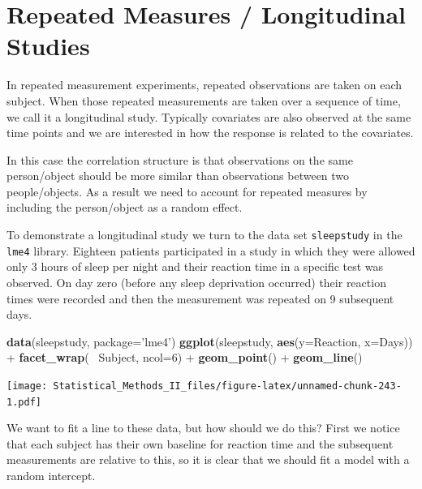 \documentclass[]{book}
\newenvironment{Shaded}{\begin{snugshade}}{\end{snugshade}}
\newcommand{\KeywordTok}[1]{\textcolor[rgb]{0.13,0.29,0.53}{\textbf{{#1}}}}
\newcommand{\DataTypeTok}[1]{\textcolor[rgb]{0.13,0.29,0.53}{{#1}}}
\newcommand{\DecValTok}[1]{\textcolor[rgb]{0.00,0.00,0.81}{{#1}}}
\newcommand{\StringTok}[1]{\textcolor[rgb]{0.31,0.60,0.02}{{#1}}}
\newcommand{\NormalTok}[1]{{#1}}
\theoremstyle{definition}
\theoremstyle{definition}
\theoremstyle{remark}
\begin{document}
\section{Repeated Measures / Longitudinal
Studies}\label{repeated-measures-longitudinal-studies}

In repeated measurement experiments, repeated observations are taken on
each subject. When those repeated measurements are taken over a sequence
of time, we call it a longitudinal study. Typically covariates are also
observed at the same time points and we are interested in how the
response is related to the covariates.

In this case the correlation structure is that observations on the same
person/object should be more similar than observations between two
people/objects. As a result we need to account for repeated measures by
including the person/object as a random effect.

To demonstrate a longitudinal study we turn to the data set
\texttt{sleepstudy} in the \texttt{lme4} library. Eighteen patients
participated in a study in which they were allowed only 3 hours of sleep
per night and their reaction time in a specific test was observed. On
day zero (before any sleep deprivation occurred) their reaction times
were recorded and then the measurement was repeated on 9 subsequent
days.

\begin{Shaded}
\begin{Highlighting}[]
\KeywordTok{data}\NormalTok{(sleepstudy, }\DataTypeTok{package=}\StringTok{'lme4'}\NormalTok{)}
\KeywordTok{ggplot}\NormalTok{(sleepstudy, }\KeywordTok{aes}\NormalTok{(}\DataTypeTok{y=}\NormalTok{Reaction, }\DataTypeTok{x=}\NormalTok{Days)) +}
\StringTok{    }\KeywordTok{facet_wrap}\NormalTok{(~}\StringTok{ }\NormalTok{Subject, }\DataTypeTok{ncol=}\DecValTok{6}\NormalTok{) +}\StringTok{ }
\StringTok{    }\KeywordTok{geom_point}\NormalTok{() +}\StringTok{ }
\StringTok{    }\KeywordTok{geom_line}\NormalTok{()}
\end{Highlighting}
\end{Shaded}

\texttt{[image: Statistical\_Methods\_II\_files/figure-latex/unnamed-chunk-243-1.pdf]}

We want to fit a line to these data, but how should we do this? First we
notice that each subject has their own baseline for reaction time and
the subsequent measurements are relative to this, so it is clear that we
should fit a model with a random intercept.
\end{document}
